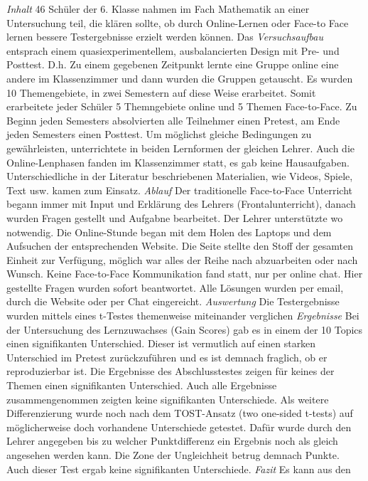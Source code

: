 \documentclass[12pt, bibliography=totoc]{scrartcl}
\begin{document}
\textbf{} \emph{Inhalt} 46 Schüler der 6. Klasse
nahmen im Fach Mathematik an einer Untersuchung teil, die klären sollte,
ob durch Online-Lernen oder Face-to Face lernen bessere Testergebnisse
erzielt werden können. Das \emph{Versuchsaufbau} entsprach einem
quasiexperimentellem, ausbalancierten Design mit Pre- und Posttest. D.h.
Zu einem gegebenen Zeitpunkt lernte eine Gruppe online eine andere im
Klassenzimmer und dann wurden die Gruppen getauscht. Es wurden 10
Themengebiete, in zwei Semestern auf diese Weise erarbeitet. Somit
erarbeitete jeder Schüler 5 Themngebiete online und 5 Themen
Face-to-Face. Zu Beginn jeden Semesters absolvierten alle Teilnehmer
einen Pretest, am Ende jeden Semesters einen Posttest. Um möglichst
gleiche Bedingungen zu gewährleisten, unterrichtete in beiden Lernformen
der gleichen Lehrer. Auch die Online-Lenphasen fanden im Klassenzimmer
statt, es gab keine Hausaufgaben. Unterschiedliche in der Literatur
beschriebenen Materialien, wie Videos, Spiele, Text usw. kamen zum
Einsatz. \emph{Ablauf} Der traditionelle Face-to-Face Unterricht begann
immer mit Input und Erklärung des Lehrers (Frontalunterricht), danach
wurden Fragen gestellt und Aufgabne bearbeitet. Der Lehrer unterstützte
wo notwendig. Die Online-Stunde began mit dem Holen des Laptops und dem
Aufsuchen der entsprechenden Website. Die Seite stellte den Stoff der
gesamten Einheit zur Verfügung, möglich war alles der Reihe nach
abzuarbeiten oder nach Wunsch. Keine Face-to-Face Kommunikation fand
statt, nur per online chat. Hier gestellte Fragen wurden sofort
beantwortet. Alle Lösungen wurden per email, durch die Website oder per
Chat eingereicht. \emph{Auswertung} Die Testergebnisse wurden mittels
eines t-Testes themenweise miteinander verglichen \emph{Ergebnisse} Bei
der Untersuchung des Lernzuwachses (Gain Scores) gab es in einem der 10
Topics einen signifikanten Unterschied. Dieser ist vermutlich auf einen
starken Unterschied im Pretest zurückzuführen und es ist demnach
fraglich, ob er reproduzierbar ist. Die Ergebnisse des Abschlusstestes
zeigen für keines der Themen einen signifikanten Unterschied. Auch alle
Ergebnisse zusammengenommen zeigten keine signifikanten Unterschiede.
Als weitere Differenzierung wurde noch nach dem TOST-Ansatz (two
one-sided t-tests) auf möglicherweise doch vorhandene Unterschiede
getestet. Dafür wurde durch den Lehrer angegeben bis zu welcher
Punktdifferenz ein Ergebnis noch als gleich angesehen werden kann. Die
Zone der Ungleichheit betrug demnach  Punkte. Auch dieser Test
ergab keine signifikanten Unterschiede. \emph{Fazit} Es kann aus den
\end{document}
